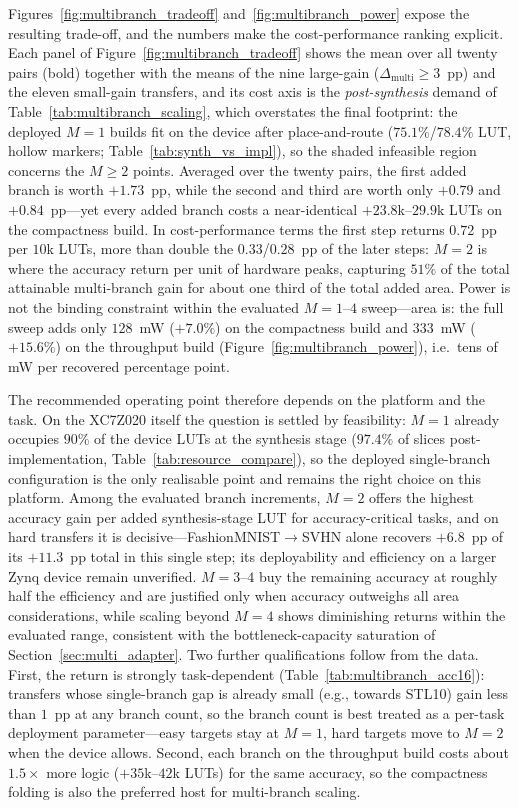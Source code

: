 \documentclass[12pt, a4paper]{report}
\numberwithin{equation}{chapter}
\numberwithin{figure}{chapter}
\numberwithin{table}{chapter}
\numberwithin{algorithm}{chapter}
\begin{document}
Figures~\ref{fig:multibranch_tradeoff} and~\ref{fig:multibranch_power} expose the resulting trade-off, and the numbers make the cost-performance ranking explicit. Each panel of Figure~\ref{fig:multibranch_tradeoff} shows the mean over all twenty pairs (bold) together with the means of the nine large-gain ($\Delta_{\text{multi}} \geq 3$~pp) and the eleven small-gain transfers, and its cost axis is the \emph{post-synthesis} demand of Table~\ref{tab:multibranch_scaling}, which overstates the final footprint: the deployed $M{=}1$ builds fit on the device after place-and-route ($75.1\%$/$78.4\%$ LUT, hollow markers; Table~\ref{tab:synth_vs_impl}), so the shaded infeasible region concerns the $M \geq 2$ points. Averaged over the twenty pairs, the first added branch is worth $+1.73$~pp, while the second and third are worth only $+0.79$ and $+0.84$~pp---yet every added branch costs a near-identical $+23.8$k--$29.9$k LUTs on the compactness build. In cost-performance terms the first step returns $0.72$~pp per $10$k LUTs, more than double the $0.33$/$0.28$~pp of the later steps: $M{=}2$ is where the accuracy return per unit of hardware peaks, capturing $51\%$ of the total attainable multi-branch gain for about one third of the total added area. Power is not the binding constraint within the evaluated $M{=}1$--$4$ sweep---area is: the full sweep adds only $128$~mW ($+7.0\%$) on the compactness build and $333$~mW ($+15.6\%$) on the throughput build (Figure~\ref{fig:multibranch_power}), i.e.\ tens of mW per recovered percentage point.

The recommended operating point therefore depends on the platform and the task. On the XC7Z020 itself the question is settled by feasibility: $M{=}1$ already occupies $90\%$ of the device LUTs at the synthesis stage ($97.4\%$ of slices post-implementation, Table~\ref{tab:resource_compare}), so the deployed single-branch configuration is the only realisable point and remains the right choice on this platform. Among the evaluated branch increments, $M{=}2$ offers the highest accuracy gain per added synthesis-stage LUT for accuracy-critical tasks, and on hard transfers it is decisive---FashionMNIST$\to$SVHN alone recovers $+6.8$~pp of its $+11.3$~pp total in this single step; its deployability and efficiency on a larger Zynq device remain unverified. $M{=}3$--$4$ buy the remaining accuracy at roughly half the efficiency and are justified only when accuracy outweighs all area considerations, while scaling beyond $M{=}4$ shows diminishing returns within the evaluated range, consistent with the bottleneck-capacity saturation of Section~\ref{sec:multi_adapter}. Two further qualifications follow from the data. First, the return is strongly task-dependent (Table~\ref{tab:multibranch_acc16}): transfers whose single-branch gap is already small (e.g., towards STL10) gain less than $1$~pp at any branch count, so the branch count is best treated as a per-task deployment parameter---easy targets stay at $M{=}1$, hard targets move to $M{=}2$ when the device allows. Second, each branch on the throughput build costs about $1.5\times$ more logic ($+35$k--$42$k LUTs) for the same accuracy, so the compactness folding is also the preferred host for multi-branch scaling.
\end{document}
